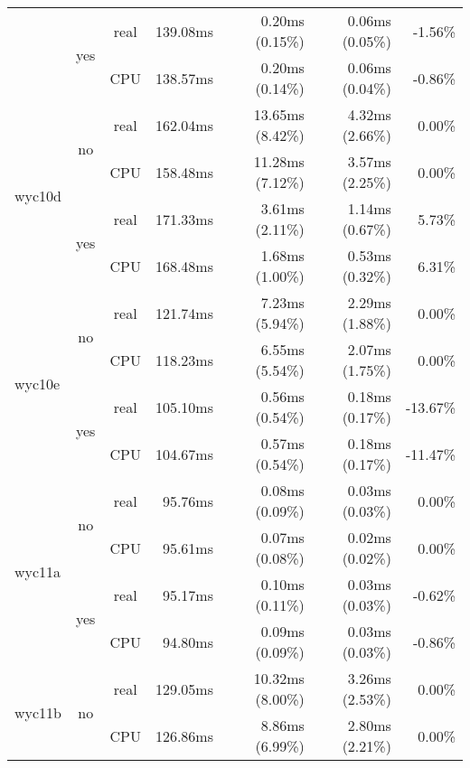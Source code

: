 \documentclass[en]{pracamgr}
\begin{document}
\begin{appendices}
\begin{small}
\begin{longtable}{|l|c|c|r|r|r|r|}
                          \cline{2-7}
                          & \multirow{2}{*}{yes} & real & 139.08ms & 0.20ms (0.15\%) & 0.06ms (0.05\%) & -1.56\% \\*
                          &                      & CPU  & 138.57ms & 0.20ms (0.14\%) & 0.06ms (0.04\%) & -0.86\% \\
\hline
\multirow{4}{*}{wyc10d}   & \multirow{2}{*}{no}  & real & 162.04ms & 13.65ms (8.42\%) & 4.32ms (2.66\%) & 0.00\% \\*
                          &                      & CPU  & 158.48ms & 11.28ms (7.12\%) & 3.57ms (2.25\%) & 0.00\% \\*
                          \cline{2-7}
                          & \multirow{2}{*}{yes} & real & 171.33ms & 3.61ms (2.11\%) & 1.14ms (0.67\%) & 5.73\% \\*
                          &                      & CPU  & 168.48ms & 1.68ms (1.00\%) & 0.53ms (0.32\%) & 6.31\% \\
\hline
\multirow{4}{*}{wyc10e}   & \multirow{2}{*}{no}  & real & 121.74ms & 7.23ms (5.94\%) & 2.29ms (1.88\%) & 0.00\% \\*
                          &                      & CPU  & 118.23ms & 6.55ms (5.54\%) & 2.07ms (1.75\%) & 0.00\% \\*
                          \cline{2-7}
                          & \multirow{2}{*}{yes} & real & 105.10ms & 0.56ms (0.54\%) & 0.18ms (0.17\%) & -13.67\% \\*
                          &                      & CPU  & 104.67ms & 0.57ms (0.54\%) & 0.18ms (0.17\%) & -11.47\% \\
\hline
\multirow{4}{*}{wyc11a}   & \multirow{2}{*}{no}  & real & 95.76ms & 0.08ms (0.09\%) & 0.03ms (0.03\%) & 0.00\% \\*
                          &                      & CPU  & 95.61ms & 0.07ms (0.08\%) & 0.02ms (0.02\%) & 0.00\% \\*
                          \cline{2-7}
                          & \multirow{2}{*}{yes} & real & 95.17ms & 0.10ms (0.11\%) & 0.03ms (0.03\%) & -0.62\% \\*
                          &                      & CPU  & 94.80ms & 0.09ms (0.09\%) & 0.03ms (0.03\%) & -0.86\% \\
\hline
\multirow{4}{*}{wyc11b}   & \multirow{2}{*}{no}  & real & 129.05ms & 10.32ms (8.00\%) & 3.26ms (2.53\%) & 0.00\% \\*
                          &                      & CPU  & 126.86ms & 8.86ms (6.99\%) & 2.80ms (2.21\%) & 0.00\% \\*

\end{longtable}
\end{small}
\end{appendices}
\end{document}
